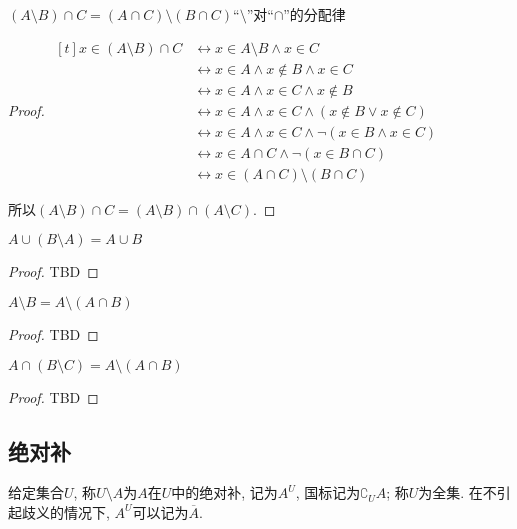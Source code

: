 \begin{proposition}
	$(A\setminus B)\cap C=(A\cap C)\setminus (B\cap C)$\quad ``$\setminus$''对``$\cap$''的分配律
\end{proposition}

\begin{proof}
	$\begin{aligned}[t]
		x\in (A\setminus B)\cap C & \leftrightarrow x\in A\setminus B\wedge x\in C \\
		& \leftrightarrow x\in A\wedge x\notin B\wedge x\in C \\
		& \leftrightarrow x\in A\wedge x\in C\wedge x\notin B \\
		& \leftrightarrow x\in A\wedge x\in C\wedge (x\notin B\vee x\notin C) \\
		& \leftrightarrow x\in A\wedge x\in C\wedge \neg(x\in B\wedge x\in C) \\
		& \leftrightarrow x\in A\cap C\wedge \neg(x\in B\cap C) \\
		& \leftrightarrow x\in (A\cap C)\setminus (B\cap C)
	\end{aligned}$
	
	所以$(A\setminus B)\cap C=(A\setminus B)\cap (A\setminus C)$.
\end{proof}

\begin{proposition}
	$A\cup (B\setminus A)=A\cup B$
\end{proposition}

\begin{proof}
	TBD
\end{proof}

\begin{proposition}
	$A\setminus B=A\setminus (A\cap B)$
\end{proposition}

\begin{proof}
	TBD
\end{proof}

\begin{proposition}
	$A\cap (B\setminus C)=A\setminus (A\cap B)$
\end{proposition}

\begin{proof}
	TBD
\end{proof}

\subsection{绝对补}
\begin{definition}
	给定集合$U$, 称$U\setminus A$为$A$在$U$中的绝对补, 记为$A^U$, 国标记为$\complement_UA$; 称$U$为全集. 在不引起歧义的情况下, $A^U$可以记为$\overline A$.
\end{definition}

